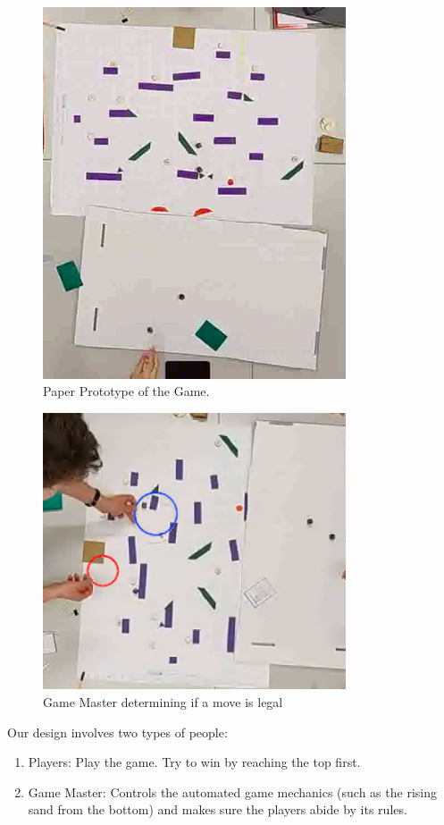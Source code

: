 \begin{figure}
    \centering
    \includegraphics[width=0.8\textwidth]{figures/Prototype/vlcsnap-2022-03-20-18h52m10s352.png}
    \caption{Paper Prototype of the Game.}
    \label{fig:prot_0}
\end{figure}

\begin{figure}
    \centering
    \includegraphics[width=0.8\textwidth]{figures/Prototype/circle.png}
    \caption{Game Master determining if a move is legal}
    \label{fig:prot_1}
\end{figure}
Our design involves two types of people:
\begin{enumerate}
    \item Players: Play the game. Try to win by reaching the top first.
    \item Game Master: Controls the automated game mechanics (such as the rising sand from the bottom) and makes sure the players abide by its rules.
\end{enumerate}

